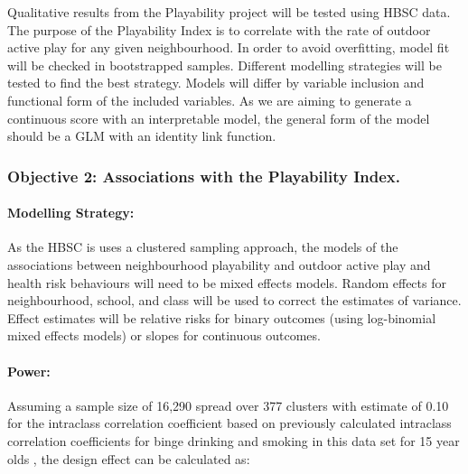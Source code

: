 \documentclass [11pt]{article}
\begin{document}
Qualitative results from the Playability project will be tested using HBSC data. The purpose of the Playability Index is to correlate with the rate of outdoor active play for any given neighbourhood. In order to avoid overfitting, model fit will be checked in bootstrapped samples. Different modelling strategies will be tested to find the best strategy. Models will differ by variable inclusion and functional form of the included variables.  As we are aiming to generate a continuous score with an interpretable model, the general form of the model should be a GLM with an identity link function.   

\subsubsection{Objective 2: Associations with the Playability Index.}


\paragraph{Modelling Strategy:} As the HBSC is uses a clustered sampling approach, the models of the associations between neighbourhood playability and outdoor active play and health risk behaviours will need to be mixed effects models. Random effects for neighbourhood, school, and class will be used to correct the estimates of variance. Effect estimates will be relative risks for binary outcomes (using log-binomial mixed effects models) or slopes for continuous outcomes. 

\paragraph{Power:} Assuming a sample size of 16,290 spread over 377 clusters with estimate of 0.10 for the intraclass correlation coefficient based on previously calculated intraclass correlation coefficients for binge drinking and smoking in this data set for 15 year olds \cite{BOYES2017663}, the design effect can be calculated as:
\end{document}
